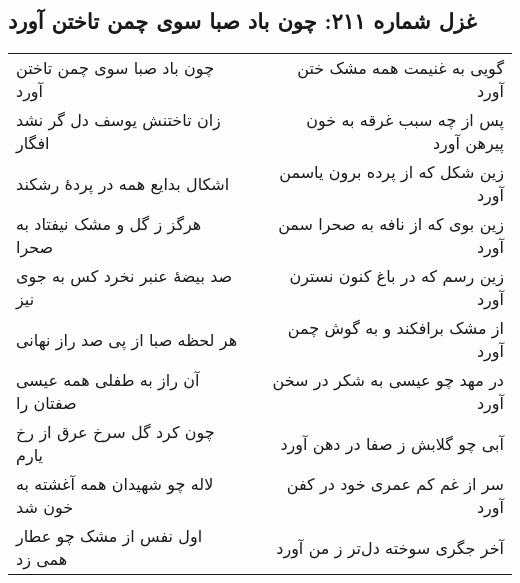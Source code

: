 \begin{center}
\section*{غزل شماره ۲۱۱: چون باد صبا سوی چمن تاختن آورد}
\label{sec:211}
\begin{longtable}{l p{0.5cm} r}
چون باد صبا سوی چمن تاختن آورد
&&
گویی به غنیمت همه مشک ختن آورد
\\
زان تاختنش یوسف دل گر نشد افگار
&&
پس از چه سبب غرقه به خون پیرهن آورد
\\
اشکال بدایع همه در پردهٔ رشکند
&&
زین شکل که از پرده برون یاسمن آورد
\\
هرگز ز گل و مشک نیفتاد به صحرا
&&
زین بوی که از نافه به صحرا سمن آورد
\\
صد بیضهٔ عنبر نخرد کس به جوی نیز
&&
زین رسم که در باغ کنون نسترن آورد
\\
هر لحظه صبا از پی صد راز نهانی
&&
از مشک برافکند و به گوش چمن آورد
\\
آن راز به طفلی همه عیسی صفتان را
&&
در مهد چو عیسی به شکر در سخن آورد
\\
چون کرد گل سرخ عرق از رخ یارم
&&
آبی چو گلابش ز صفا در دهن آورد
\\
لاله چو شهیدان همه آغشته به خون شد
&&
سر از غم کم عمری خود در کفن آورد
\\
اول نفس از مشک چو عطار همی زد
&&
آخر جگری سوخته دل‌تر ز من آورد
\\
\end{longtable}
\end{center}
